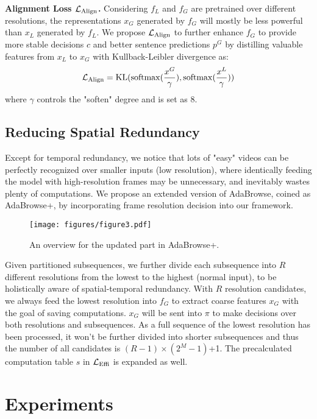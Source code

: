 \documentclass[sigconf]{acmart}
\begin{document}
\textbf{Alignment Loss $\mathcal{L}_{{\rm Align}}$.} Considering $f_L$ and $f_G$ are pretrained over different resolutions, the representations $x_G$ generated by $f_G$ will mostly be less powerful than $x_L$ generated by $f_L$. We propose $\mathcal{L}_{{\rm Align}}$ to further enhance $f_G$ to provide more stable decisions $c$ and better sentence predictions $p^G$ by distilling valuable features from $x_L$ to $x_G$ with Kullback-Leibler divergence as:
  \begin{equation}
    \label{e11}
    \mathcal{L}_{{\rm Align}} = {\rm KL}({\rm softmax}(\frac{x^G}{\gamma }),{\rm softmax}({\frac{x^L}{\gamma}}))
    \end{equation}
where $\gamma$ controls the "soften" degree and is set as 8.
  
\subsection{Reducing Spatial Redundancy}
Except for temporal redundancy, we notice that lots of "easy" videos can be perfectly recognized over smaller inputs (low resolution), where identically feeding the model with high-resolution frames may be unnecessary, and inevitably wastes plenty of computations. We propose an extended version of AdaBrowse, coined as AdaBrowse+, by incorporating frame resolution decision into our framework.
  
  \begin{figure}[t]
    \centering
    \texttt{[image: figures/figure3.pdf]} 
    \caption{An overview for the updated part in AdaBrowse+.}
    \label{fig3}
  \end{figure}
 
Given partitioned subsequences, we further divide each subsequence into $R$ different resolutions from the lowest to the highest (normal input), to be holistically aware of spatial-temporal redundancy. With $R$ resolution candidates, we always feed the lowest resolution into $f_G$ to extract coarse features $x_G$ with the goal of saving computations. $x_G$ will be sent into $\pi$ to make decisions over both resolutions and subsequences. As a full sequence of the lowest resolution has been processed, it won't be further divided into shorter subsequences and thus the number of all candidates is $(R-1)\times (2^M-1)$+1. The precalculated computation table $s$ in $\mathcal{L}_{{\rm Effi}}$ is expanded as well.

\section{Experiments}
\end{document}
